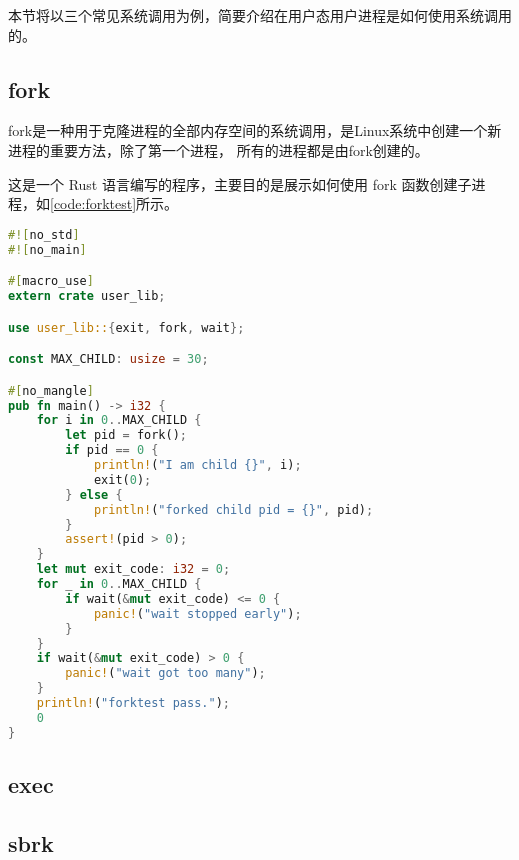 本节将以三个常见系统调用为例，简要介绍在用户态用户进程是如何使用系统调用的。

\subsection{fork}

fork是一种用于克隆进程的全部内存空间的系统调用，是Linux系统中创建一个新进程的重要方法，除了第一个进程，
所有的进程都是由fork创建的。

这是一个 Rust 语言编写的程序，主要目的是展示如何使用 fork 函数创建子进程，如\autoref{code:forktest}所示。

\begin{lstlisting}[language={Rust}, label={code:forktest},
    caption={forktest.rs}]
#![no_std]
#![no_main]

#[macro_use]
extern crate user_lib;

use user_lib::{exit, fork, wait};

const MAX_CHILD: usize = 30;

#[no_mangle]
pub fn main() -> i32 {
    for i in 0..MAX_CHILD {
        let pid = fork();
        if pid == 0 {
            println!("I am child {}", i);
            exit(0);
        } else {
            println!("forked child pid = {}", pid);
        }
        assert!(pid > 0);
    }
    let mut exit_code: i32 = 0;
    for _ in 0..MAX_CHILD {
        if wait(&mut exit_code) <= 0 {
            panic!("wait stopped early");
        }
    }
    if wait(&mut exit_code) > 0 {
        panic!("wait got too many");
    }
    println!("forktest pass.");
    0
}
\end{lstlisting}

\subsection{exec}
\subsection{sbrk}